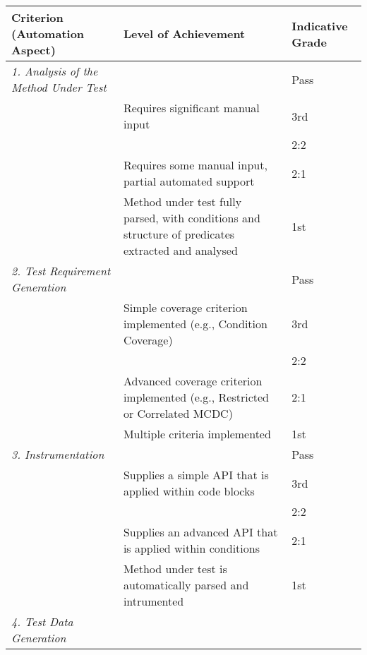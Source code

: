 {
\scriptsize
\begin{tabular}{lp{30em}l} 

    \toprule

    {\bf Criterion (Automation Aspect)} & {\bf Level of Achievement} & {\bf Indicative Grade} \\

    \midrule

    {\it 1. Analysis of the Method Under Test} 
    
    & & Pass \\
    & Requires significant manual input & 3rd  \\ \cline{2-3}
    & & 2:2  \\
    & Requires some manual input, partial automated support & 2:1  \\ \cline{2-3}
    & Method under test fully parsed, with conditions and structure of
    predicates extracted and analysed & 1st  \\

    \midrule

    {\it 2. Test Requirement Generation}

    & & Pass \\
    & Simple coverage criterion implemented (e.g., Condition Coverage) & 3rd  \\
    \cline{2-3}
    & & 2:2  \\ 
    & Advanced coverage criterion implemented (e.g., Restricted or Correlated
    MCDC) & 2:1  \\ \cline{2-3}
    & Multiple criteria implemented & 1st  \\

    \midrule

    {\it 3. Instrumentation}

    & & Pass \\
    & Supplies a simple API that is applied within code blocks & 3rd  \\  \cline{2-3}
    & & 2:2  \\
    & Supplies an advanced API that is applied within conditions & 2:1  \\ \cline{2-3}
    & Method under test is automatically parsed and intrumented & 1st  \\

    \midrule

    {\it 4. Test Data Generation}


\end{tabular}}

